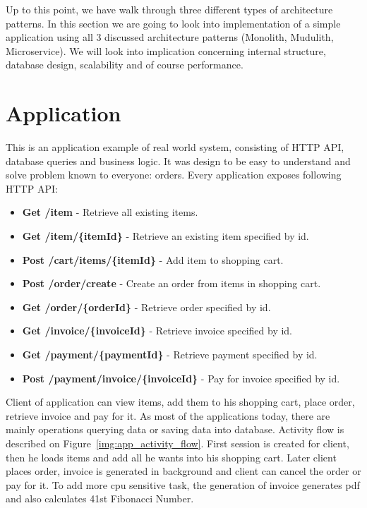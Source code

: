 

Up to this point, we have walk through three different types of architecture patterns. In this section we are going to look into implementation of a simple application using all 3 discussed architecture patterns (Monolith, Mudulith, Microservice). We will look into implication concerning internal structure, database design, scalability and of course performance.

\section{Application}
This is an application example of real world system, consisting of HTTP API, database queries and business logic. It was design to be easy to understand and solve problem known to everyone: orders. Every application exposes following HTTP API:
\begin{itemize}
    \item \textbf{Get /item} - Retrieve all existing items.
    \item \textbf{Get /item/\{itemId\}} - Retrieve an existing item specified by id.
    \item \textbf{Post /cart/items/\{itemId\}} - Add item to shopping cart.
    \item \textbf{Post /order/create} - Create an order from items in shopping cart.
    \item \textbf{Get /order/\{orderId\}} - Retrieve order specified by id.
    \item \textbf{Get /invoice/\{invoiceId\}} - Retrieve invoice specified by id.
    \item \textbf{Get /payment/\{paymentId\}} - Retrieve payment specified by id.
    \item \textbf{Post /payment/invoice/\{invoiceId\}} - Pay for invoice specified by id.
\end{itemize}

Client of application can view items, add them to his shopping cart, place order, retrieve invoice and pay for it. As most of the applications today, there are mainly operations querying data or saving data into database. Activity flow is described on Figure~\ref{img:app_activity_flow}. First session is created for client, then he loads items and add all he wants into his shopping cart. Later client places order, invoice is generated in background and client can cancel the order or pay for it. To add more cpu sensitive task, the generation of invoice generates pdf and also calculates 41st Fibonacci Number.

